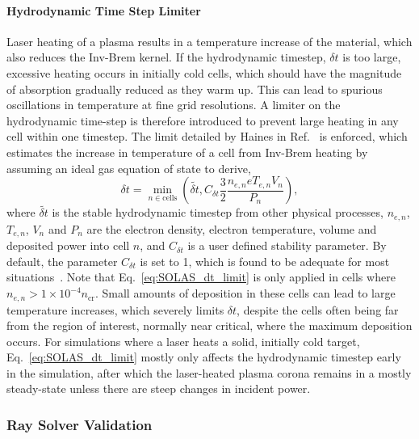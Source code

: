 \paragraph*{Hydrodynamic Time Step Limiter}
Laser heating of a plasma results in a temperature increase of the material, which also reduces the \ac{Inv-Brem} kernel.
If the hydrodynamic timestep, $\delta t$ is too large, excessive heating occurs in initially cold cells, which should have the magnitude of absorption gradually reduced as they warm up.
This can lead to spurious oscillations in temperature at fine grid resolutions.
A limiter on the hydrodynamic time-step is therefore introduced to prevent large heating in any cell within one timestep.
The limit detailed by Haines in Ref.~\cite{haines_coupling_2020} is enforced, which estimates the increase in temperature of a cell from \ac{Inv-Brem} heating by assuming an ideal gas equation of state to derive,
\begin{equation}
    \label{eq:SOLAS_dt_limit}
    \delta t = \min_{n\in \text{cells}}{\left( \tilde{\delta t}, C_{\delta t} \frac{3}{2} \frac{n_{e,n} e T_{e,n} V_n }{P_n} \right)},
\end{equation}
where $\tilde{\delta t}$ is the stable hydrodynamic timestep from other physical processes, $n_{e,n}$, $T_{e,n}$, $V_n$ and $P_n$ are the electron density, electron temperature, volume and deposited power into cell $n$, and $C_{\delta t}$ is a user defined stability parameter.
By default, the parameter $C_{\delta t}$ is set to 1, which is found to be adequate for most situations~\cite{haines_coupling_2020}.
Note that Eq.~\ref{eq:SOLAS_dt_limit} is only applied in cells where $n_{e,n}>1\times 10^{-4} n_{\text{cr}}$.
Small amounts of deposition in these cells can lead to large temperature increases, which severely limits $\delta t$, despite the cells often being far from the region of interest, normally near critical, where the maximum deposition occurs.
For simulations where a laser heats a solid, initially cold target, Eq.~\ref{eq:SOLAS_dt_limit} mostly only affects the hydrodynamic timestep early in the simulation, after which the laser-heated plasma corona remains in a mostly steady-state unless there are steep changes in incident power.

\subsubsection{Ray Solver Validation}%
\label{sec:SOLAS_ray_validation}


